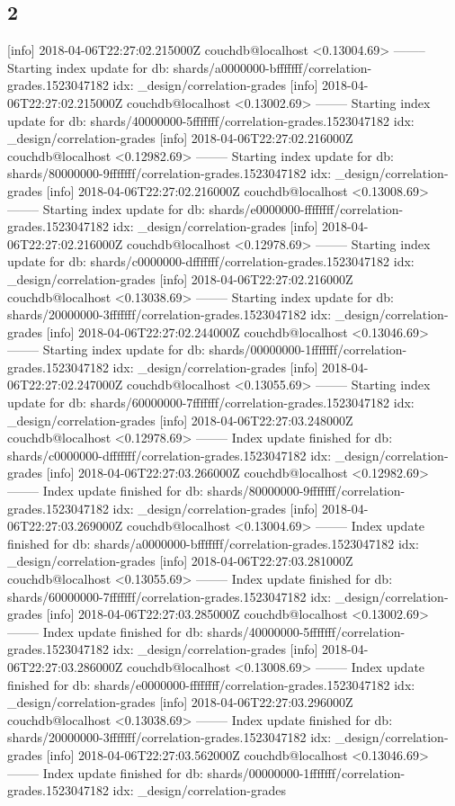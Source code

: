 \subsection{2}
[info] 2018-04-06T22:27:02.215000Z couchdb@localhost <0.13004.69> -------- Starting index update for db: shards/a0000000-bfffffff/correlation-grades.1523047182 idx: _design/correlation-grades
[info] 2018-04-06T22:27:02.215000Z couchdb@localhost <0.13002.69> -------- Starting index update for db: shards/40000000-5fffffff/correlation-grades.1523047182 idx: _design/correlation-grades
[info] 2018-04-06T22:27:02.216000Z couchdb@localhost <0.12982.69> -------- Starting index update for db: shards/80000000-9fffffff/correlation-grades.1523047182 idx: _design/correlation-grades
[info] 2018-04-06T22:27:02.216000Z couchdb@localhost <0.13008.69> -------- Starting index update for db: shards/e0000000-ffffffff/correlation-grades.1523047182 idx: _design/correlation-grades
[info] 2018-04-06T22:27:02.216000Z couchdb@localhost <0.12978.69> -------- Starting index update for db: shards/c0000000-dfffffff/correlation-grades.1523047182 idx: _design/correlation-grades
[info] 2018-04-06T22:27:02.216000Z couchdb@localhost <0.13038.69> -------- Starting index update for db: shards/20000000-3fffffff/correlation-grades.1523047182 idx: _design/correlation-grades
[info] 2018-04-06T22:27:02.244000Z couchdb@localhost <0.13046.69> -------- Starting index update for db: shards/00000000-1fffffff/correlation-grades.1523047182 idx: _design/correlation-grades
[info] 2018-04-06T22:27:02.247000Z couchdb@localhost <0.13055.69> -------- Starting index update for db: shards/60000000-7fffffff/correlation-grades.1523047182 idx: _design/correlation-grades
[info] 2018-04-06T22:27:03.248000Z couchdb@localhost <0.12978.69> -------- Index update finished for db: shards/c0000000-dfffffff/correlation-grades.1523047182 idx: _design/correlation-grades
[info] 2018-04-06T22:27:03.266000Z couchdb@localhost <0.12982.69> -------- Index update finished for db: shards/80000000-9fffffff/correlation-grades.1523047182 idx: _design/correlation-grades
[info] 2018-04-06T22:27:03.269000Z couchdb@localhost <0.13004.69> -------- Index update finished for db: shards/a0000000-bfffffff/correlation-grades.1523047182 idx: _design/correlation-grades
[info] 2018-04-06T22:27:03.281000Z couchdb@localhost <0.13055.69> -------- Index update finished for db: shards/60000000-7fffffff/correlation-grades.1523047182 idx: _design/correlation-grades
[info] 2018-04-06T22:27:03.285000Z couchdb@localhost <0.13002.69> -------- Index update finished for db: shards/40000000-5fffffff/correlation-grades.1523047182 idx: _design/correlation-grades
[info] 2018-04-06T22:27:03.286000Z couchdb@localhost <0.13008.69> -------- Index update finished for db: shards/e0000000-ffffffff/correlation-grades.1523047182 idx: _design/correlation-grades
[info] 2018-04-06T22:27:03.296000Z couchdb@localhost <0.13038.69> -------- Index update finished for db: shards/20000000-3fffffff/correlation-grades.1523047182 idx: _design/correlation-grades
[info] 2018-04-06T22:27:03.562000Z couchdb@localhost <0.13046.69> -------- Index update finished for db: shards/00000000-1fffffff/correlation-grades.1523047182 idx: _design/correlation-grades

